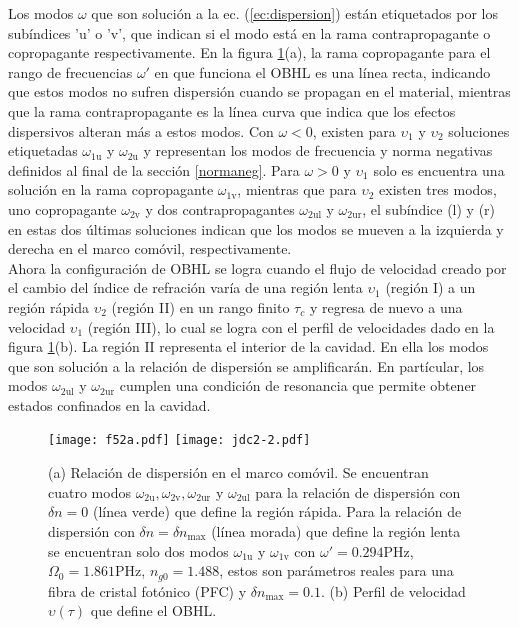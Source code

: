 Los modos $\omega$ que son soluci\'{o}n a la ec. (\ref{ec:dispersion}) est\'{a}n etiquetados por los sub\'{i}ndices 'u' o 'v', que indican si el modo est\'{a} en la rama contrapropagante o copropagante respectivamente. En la figura \ref{fig:5.1}(a), la rama copropagante para el rango de frecuencias $\omega'$ en que funciona el OBHL es una l\'{i}nea recta, indicando que estos modos no sufren dispersi\'{o}n cuando se propagan en el material, mientras que la rama contrapropagante es la l\'{i}nea curva que indica que los efectos dispersivos alteran m\'{a}s a estos modos. Con $\omega<0$, existen para $\upsilon_1$ y $\upsilon_2$ soluciones etiquetadas $\omega_{\text{1u}}$ y $\omega_{\text{2u}}$ y representan los modos de frecuencia y norma negativas definidos al final de la secci\'{o}n \ref{normaneg}. Para $\omega>0$ y  $\upsilon_1$ solo es encuentra una soluci\'{o}n en la rama copropagante $\omega_{\text{1v}}$, mientras que para $\upsilon_2$ existen tres modos, uno copropagante $\omega_{\text{2v}}$ y dos contrapropagantes $\omega_{\text{2ul}}$ y $\omega_{\text{2ur}}$, el sub\'{i}ndice (l) y (r) en estas dos \'{u}ltimas soluciones indican que los modos se mueven a la izquierda y derecha en el marco com\'{o}vil, respectivamente.\\

Ahora la configuraci\'{o}n de OBHL se logra cuando el flujo de velocidad creado por el cambio del \'{i}ndice de refraci\'{o}n var\'{i}a de una regi\'{o}n lenta $\upsilon_1$ (regi\'{o}n I) a un regi\'{o}n r\'{a}pida  $\upsilon_2$ (regi\'{o}n II) en un rango finito $\tau_c$ y regresa de nuevo a una velocidad $\upsilon_1$ (regi\'{o}n III), lo cual se logra con el perfil de velocidades dado en la figura \ref{fig:5.1}(b). La regi\'{o}n $\text{II}$ representa el interior de la cavidad. En ella los modos que son soluci\'{o}n a la relaci\'{o}n de dispersi\'{o}n se amplificar\'{a}n. En part\'{i}cular, los modos $\omega_{\text{2ul}}$ y $\omega_{\text{2ur}}$ cumplen una condici\'{o}n de resonancia que permite obtener estados confinados en la cavidad.
\begin{figure}
   \centering
   \texttt{[image: f52a.pdf]}%
   \hspace{0.1cm}%
   \texttt{[image: jdc2-2.pdf]}%
   \caption{(a) Relaci\'{o}n de dispersi\'{o}n en el marco com\'{o}vil. Se encuentran cuatro modos $\omega_{\text{2u}},\omega_{\text{2v}},\omega_{\text{2ur}}$ y $\omega_{\text{2ul}}$ para la relaci\'{o}n de dispersi\'{o}n con $\delta n=0$ (l\'{i}nea verde) que define la regi\'{o}n r\'{a}pida. Para la relaci\'{o}n de dispersi\'{o}n con $\delta n=\delta n_{\text{max}}$ (l\'{i}nea morada) que define la regi\'{o}n lenta se encuentran solo dos modos $\omega_{\text{1u}}$ y $\omega_{\text{1v}}$ con $\omega'=0.294\text{PHz}$, $\Omega_0=1.861\text{PHz}$, $n_{g0}=1.488$, estos son par\'{a}metros reales para una fibra de cristal fot\'{o}nico (PFC) y $\delta n_{\text{max}}=0.1$. (b) Perfil de velocidad $\upsilon(\tau)$ que define el OBHL.} 
   \label{fig:5.1}
\end{figure}

